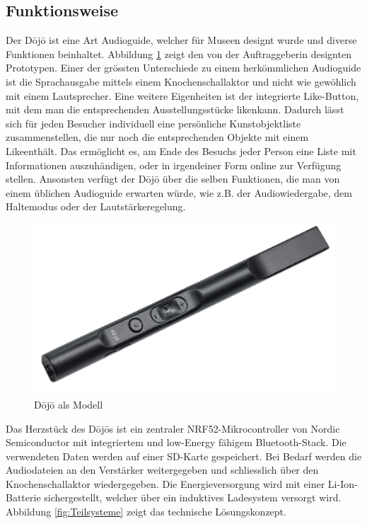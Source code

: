 \subsection{Funktionsweise} \label{sec:funktionsweise}
Der Dōjō ist eine Art Audioguide, welcher für Museen designt wurde und diverse Funktionen beinhaltet. Abbildung \ref{fig:Funktion Dojo} zeigt den von der Auftraggeberin designten Prototypen. Einer der grössten Unterschiede zu einem herkömmlichen Audioguide ist die Sprachausgabe mittels einem Knochenschallaktor und nicht wie gewöhlich mit einem Lautsprecher. Eine weitere Eigenheiten ist der integrierte \glqq Like\grqq-Button, mit dem man die entsprechenden Ausstellungsstücke \glqq liken\grqq kann. Dadurch lässt sich für jeden Besucher individuell eine persönliche Kunstobjektliste zusammenstellen, die nur noch die entsprechenden Objekte mit einem \glqq Like\grqq enthält. Das ermöglicht es, am Ende des Besuchs jeder Person eine Liste mit Informationen auszuhändigen, oder in irgendeiner Form online zur Verfügung stellen. Ansonsten verfügt der Dōjō über die selben Funktionen, die man von einem üblichen Audioguide erwarten würde, wie z.B. der Audiowiedergabe, dem Haltemodus oder der Lautstärkeregelung.

\begin{figure}[H]
	\begin{center}
		\includegraphics[width=120mm]{data/Dojo.png}
		\caption[Dōjō als Modell]{Dōjō als Modell} %
		\label{fig:Funktion Dojo}
	\end{center}
\end{figure}

Das Herzstück des Dōjōs ist ein zentraler NRF52-Mikrocontroller von Nordic Semiconductor mit integriertem und low-Energy fähigem Bluetooth-Stack. Die verwendeten Daten werden auf einer SD-Karte gespeichert. Bei Bedarf werden die Audiodateien an den Verstärker weitergegeben und schliesslich über den Knochenschallaktor wiedergegeben. Die Energieversorgung wird mit einer Li-Ion-Batterie sichergestellt, welcher über ein induktives Ladesystem versorgt wird. Abbildung \ref{fig:Teilsysteme} zeigt das technische Lösungskonzept.

